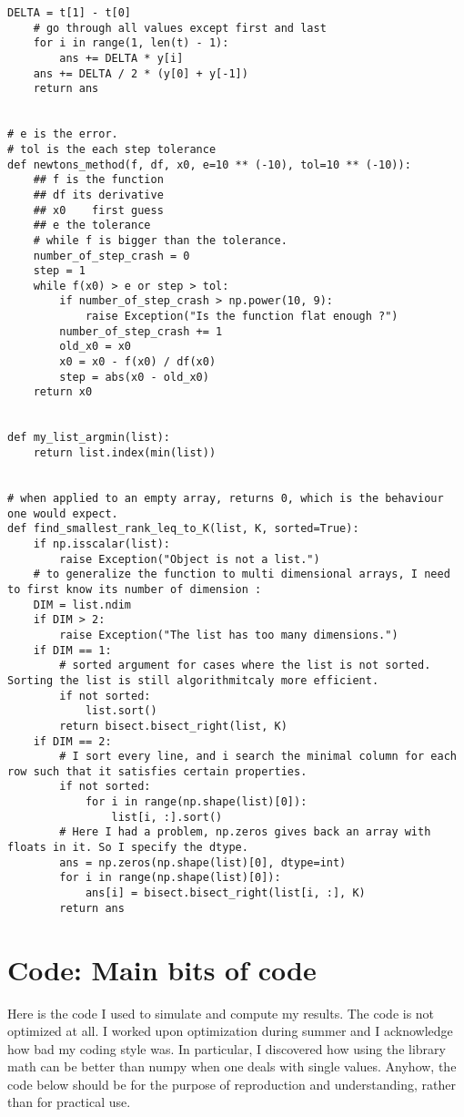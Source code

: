 \begin{Verbatim}[fontsize=\tiny]
    DELTA = t[1] - t[0]
    # go through all values except first and last
    for i in range(1, len(t) - 1):
        ans += DELTA * y[i]
    ans += DELTA / 2 * (y[0] + y[-1])
    return ans


# e is the error.
# tol is the each step tolerance
def newtons_method(f, df, x0, e=10 ** (-10), tol=10 ** (-10)):
    ## f is the function
    ## df its derivative
    ## x0    first guess
    ## e the tolerance
    # while f is bigger than the tolerance.
    number_of_step_crash = 0
    step = 1
    while f(x0) > e or step > tol:
        if number_of_step_crash > np.power(10, 9):
            raise Exception("Is the function flat enough ?")
        number_of_step_crash += 1
        old_x0 = x0
        x0 = x0 - f(x0) / df(x0)
        step = abs(x0 - old_x0)
    return x0


def my_list_argmin(list):
    return list.index(min(list))


# when applied to an empty array, returns 0, which is the behaviour one would expect.
def find_smallest_rank_leq_to_K(list, K, sorted=True):
    if np.isscalar(list):
        raise Exception("Object is not a list.")
    # to generalize the function to multi dimensional arrays, I need to first know its number of dimension :
    DIM = list.ndim
    if DIM > 2:
        raise Exception("The list has too many dimensions.")
    if DIM == 1:
        # sorted argument for cases where the list is not sorted. Sorting the list is still algorithmitcaly more efficient.
        if not sorted:
            list.sort()
        return bisect.bisect_right(list, K)
    if DIM == 2:
        # I sort every line, and i search the minimal column for each row such that it satisfies certain properties.
        if not sorted:
            for i in range(np.shape(list)[0]):
                list[i, :].sort()
        # Here I had a problem, np.zeros gives back an array with floats in it. So I specify the dtype.
        ans = np.zeros(np.shape(list)[0], dtype=int)
        for i in range(np.shape(list)[0]):
            ans[i] = bisect.bisect_right(list[i, :], K)
        return ans
\end{Verbatim}

\chapter{Code: Main bits of code}

Here is the code I used to simulate and compute my results. The code is not optimized at all. I worked upon optimization during summer and I acknowledge how bad my coding style was. In particular, I discovered how using the library math can be better than numpy when one deals with single values. Anyhow, the code below should be for the purpose of reproduction and understanding, rather than for practical use.





